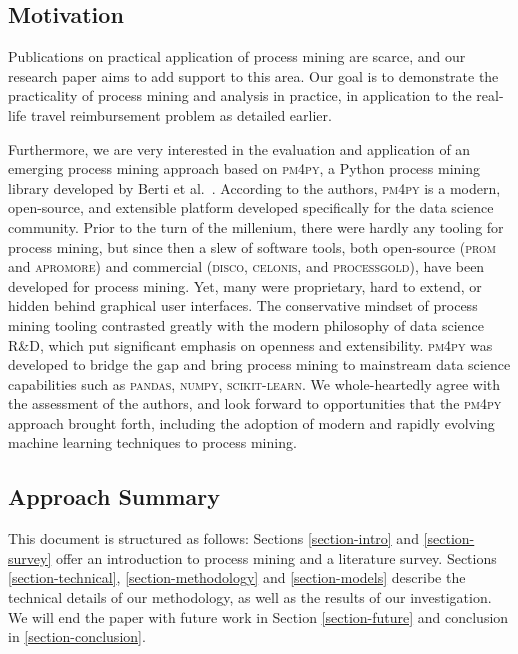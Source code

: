 \documentclass[conference]{IEEEtran}
\begin{document}
\subsection{Motivation}

Publications on practical application of process mining are scarce,
and our research paper aims to add support to this area. Our goal is
to demonstrate the practicality of process mining and analysis
in practice, in application to the real-life travel reimbursement problem
as detailed earlier.

Furthermore, we are very interested in the evaluation and application
of an emerging process mining approach based on
\textsc{pm4py}, a Python process mining library
developed by Berti et al.~\cite{BeZe2019}.
According to the authors,
\textsc{pm4py} is a modern, open-source, and extensible platform developed
specifically for the data science community. Prior to the turn of the
millenium,
there were hardly any tooling for process mining, but
since then a slew of software tools, both open-source
(\textsc{prom} and \textsc{apromore}) and commercial
(\textsc{disco}, \textsc{celonis}, and \textsc{processgold}),
have been developed for process mining.
Yet, many were proprietary, hard to extend,
or hidden behind graphical user interfaces.
The conservative mindset of process mining
tooling contrasted greatly with the modern philosophy of data science
R\&D,
which put significant emphasis on openness and extensibility.
\textsc{pm4py} was developed to bridge the gap
and bring process mining to mainstream data science
capabilities such as
\textsc{pandas}, \textsc{numpy}, \textsc{scikit-learn}.
We whole-heartedly
agree with the assessment of the authors, and look forward to opportunities
that the \textsc{pm4py} approach brought forth, including
the adoption of modern and rapidly evolving machine learning
techniques to process mining.


\subsection{Approach Summary}

This document is structured as follows: Sections \ref{section-intro} and
\ref{section-survey}
offer an introduction to process mining and a literature survey.
Sections \ref{section-technical}, \ref{section-methodology} and
\ref{section-models} describe the technical details of our methodology, as
well as the results of our investigation. We will end the paper with
future work in Section \ref{section-future} and conclusion in
\ref{section-conclusion}.
\end{document}
